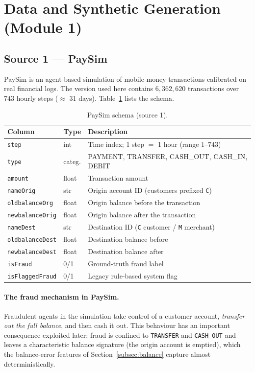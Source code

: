 \documentclass{article}
\begin{document}
\section{Data and Synthetic Generation (Module 1)}
\label{sec:data}

\subsection{Source 1 --- PaySim}
PaySim is an agent-based simulation of mobile-money transactions
calibrated on real financial logs. The version used here contains
$6{,}362{,}620$ transactions over $743$ hourly steps
($\approx$ 31 days). Table~\ref{tab:schema} lists the schema.

\begin{table}[H]
\centering
\caption{PaySim schema (source 1).}
\label{tab:schema}
\small
\begin{tabular}{lll}
\toprule
Column & Type & Description \\
\midrule
\texttt{step}            & int   & Time index; 1 step $=$ 1 hour (range $1$--$743$) \\
\texttt{type}            & categ.& PAYMENT, TRANSFER, CASH\_OUT, CASH\_IN, DEBIT \\
\texttt{amount}          & float & Transaction amount \\
\texttt{nameOrig}        & str   & Origin account ID (customers prefixed \texttt{C}) \\
\texttt{oldbalanceOrg}   & float & Origin balance before the transaction \\
\texttt{newbalanceOrig}  & float & Origin balance after the transaction \\
\texttt{nameDest}        & str   & Destination ID (\texttt{C} customer / \texttt{M} merchant) \\
\texttt{oldbalanceDest}  & float & Destination balance before \\
\texttt{newbalanceDest}  & float & Destination balance after \\
\texttt{isFraud}         & 0/1   & Ground-truth fraud label \\
\texttt{isFlaggedFraud}  & 0/1   & Legacy rule-based system flag \\
\bottomrule
\end{tabular}
\end{table}

\paragraph{The fraud mechanism in PaySim.} Fraudulent agents in the
simulation take control of a customer account, \emph{transfer out the
full balance}, and then cash it out. This behaviour has an important
consequence exploited later: fraud is confined to \texttt{TRANSFER} and
\texttt{CASH\_OUT} and leaves a characteristic balance signature (the
origin account is emptied), which the balance-error features of
Section~\ref{subsec:balance} capture almost deterministically.
\end{document}
